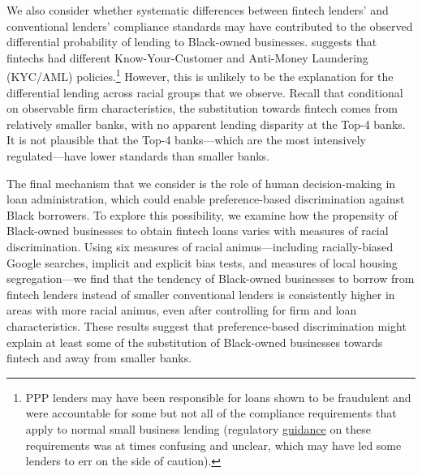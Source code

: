 \documentclass[11pt]{article}
\begin{document}
We also consider whether systematic differences between fintech lenders' and conventional lenders' compliance standards may have contributed to the observed differential probability of lending to Black-owned businesses. \cite{griffin2021did} suggests that fintechs had different Know-Your-Customer and Anti-Money Laundering (KYC/AML) policies.\footnote{PPP lenders may have been responsible for loans shown to be fraudulent and were accountable for some but not all of the compliance requirements that apply to normal small business lending (regulatory  \href{https://www.acfcs.org/new-treasury-guidance-on-intersection-of-aml-bsa-sba-and-ppp-stimulus-loans-could-cause-more-confusion-than-clarity/}{guidance} on these requirements was at times confusing and unclear, which may have led some lenders to err on the side of caution).} However, this is unlikely to be the explanation for the differential lending across racial groups that we observe. Recall that conditional on observable firm characteristics, the substitution towards fintech comes from relatively smaller banks, with no apparent lending disparity at the Top-4 banks. It is not plausible that the Top-4 banks---which are the most intensively regulated---have lower standards than smaller banks. 

The final mechanism that we consider is the role of human decision-making in loan administration, which could enable preference-based discrimination against Black borrowers. To explore this possibility, we examine how the propensity of Black-owned businesses to obtain fintech loans varies with measures of racial discrimination. Using six measures of racial animus---including racially-biased Google searches, implicit and explicit bias tests, and measures of local housing segregation---we find that the tendency of Black-owned businesses to borrow from fintech lenders instead of smaller conventional lenders is consistently higher in areas with more racial animus, even after controlling for firm and loan characteristics. These results suggest that preference-based discrimination might explain at least some of the substitution of Black-owned businesses towards fintech and away from smaller banks.
\end{document}
